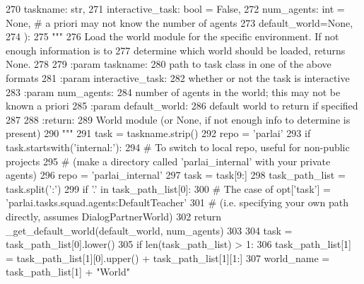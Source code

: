 \begin{DoxyCode}
270     taskname: str,
271     interactive\_task: bool = \textcolor{keyword}{False},
272     num\_agents: int = \textcolor{keywordtype}{None},  \textcolor{comment}{# a priori may not know the number of agents}
273     default\_world=\textcolor{keywordtype}{None},
274 ):
275     \textcolor{stringliteral}{"""}
276 \textcolor{stringliteral}{    Load the world module for the specific environment. If not enough information is to}
277 \textcolor{stringliteral}{    determine which world should be loaded, returns None.}
278 \textcolor{stringliteral}{}
279 \textcolor{stringliteral}{    :param taskname:}
280 \textcolor{stringliteral}{        path to task class in one of the above formats}
281 \textcolor{stringliteral}{    :param interactive\_task:}
282 \textcolor{stringliteral}{        whether or not the task is interactive}
283 \textcolor{stringliteral}{    :param num\_agents:}
284 \textcolor{stringliteral}{        number of agents in the world; this may not be known a priori}
285 \textcolor{stringliteral}{    :param default\_world:}
286 \textcolor{stringliteral}{        default world to return if specified}
287 \textcolor{stringliteral}{}
288 \textcolor{stringliteral}{    :return:}
289 \textcolor{stringliteral}{        World module (or None, if not enough info to determine is present)}
290 \textcolor{stringliteral}{    """}
291     task = taskname.strip()
292     repo = \textcolor{stringliteral}{'parlai'}
293     \textcolor{keywordflow}{if} task.startswith(\textcolor{stringliteral}{'internal:'}):
294         \textcolor{comment}{# To switch to local repo, useful for non-public projects}
295         \textcolor{comment}{# (make a directory called 'parlai\_internal' with your private agents)}
296         repo = \textcolor{stringliteral}{'parlai\_internal'}
297         task = task[9:]
298     task\_path\_list = task.split(\textcolor{stringliteral}{':'})
299     \textcolor{keywordflow}{if} \textcolor{stringliteral}{'.'} \textcolor{keywordflow}{in} task\_path\_list[0]:
300         \textcolor{comment}{# The case of opt['task'] = 'parlai.tasks.squad.agents:DefaultTeacher'}
301         \textcolor{comment}{# (i.e. specifying your own path directly, assumes DialogPartnerWorld)}
302         \textcolor{keywordflow}{return} \_get\_default\_world(default\_world, num\_agents)
303 
304     task = task\_path\_list[0].lower()
305     \textcolor{keywordflow}{if} len(task\_path\_list) > 1:
306         task\_path\_list[1] = task\_path\_list[1][0].upper() + task\_path\_list[1][1:]
307         world\_name = task\_path\_list[1] + \textcolor{stringliteral}{"World"}

\end{DoxyCode}
